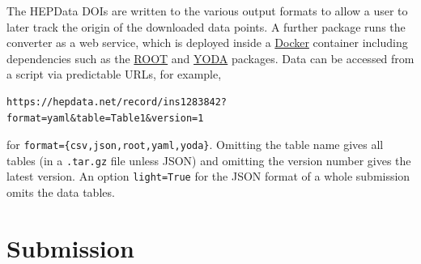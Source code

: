 \documentclass[a4paper]{jpconf}
\begin{document}
%
The HEPData DOIs are written to the various output formats to allow a user to
later track the origin of the downloaded data points.  A further package runs
the converter as a web service, which is deployed inside a
\href{https://www.docker.com}{Docker} container including dependencies such as
the \href{https://root.cern.ch}{ROOT} and
\href{https://yoda.hepforge.org}{YODA} packages.  Data can be accessed from a
script via predictable URLs, for example,
%
\begin{verbatim}
https://hepdata.net/record/ins1283842?format=yaml&table=Table1&version=1
\end{verbatim}
%
for \verb+format={csv,json,root,yaml,yoda}+.  Omitting the table name gives
all tables (in a \texttt{.tar.gz} file unless JSON) and omitting the version
number gives the latest version.  An option \texttt{light=True} for the JSON
format of a whole submission omits the data tables.

\section{Submission}
\end{document}
